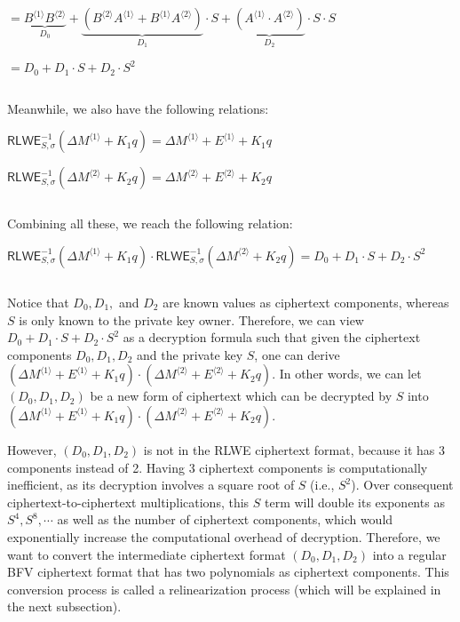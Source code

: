 $ = \underbrace{B^{\langle 1 \rangle}B^{\langle 2 \rangle}}_{D_0}  + \underbrace{(B^{\langle 2 \rangle}A^{\langle 1 \rangle} + B^{\langle 1 \rangle}A^{\langle 2 \rangle})}_{D_1} \cdot S + \underbrace{(A^{\langle 1 \rangle} \cdot A^{\langle 2 \rangle})}_{D_2} \cdot S \cdot S $



$= D_0 + D_1\cdot S + D_2\cdot S^2$



$ $

Meanwhile, we also have the following relations:

$\textsf{RLWE}_{S, \sigma}^{-1}(\Delta M^{\langle 1 \rangle} + K_1q) = \Delta M^{\langle 1 \rangle} + E^{\langle 1 \rangle} + K_1q$

$\textsf{RLWE}_{S, \sigma}^{-1}(\Delta M^{\langle 2 \rangle} + K_2q) = \Delta M^{\langle 2 \rangle} + E^{\langle 2 \rangle} + K_2q$

$ $

Combining all these, we reach the following relation: 

$\textsf{RLWE}_{S, \sigma}^{-1}(\Delta M^{\langle 1 \rangle} + K_1q) \cdot \textsf{RLWE}_{S, \sigma}^{-1}(\Delta M^{\langle 2 \rangle} + K_2q) = D_0 + D_1\cdot S + D_2\cdot S^2$

$ $

Notice that $D_0, D_1,$ and $D_2$ are known values as ciphertext components, whereas $S$ is only known to the private key owner. Therefore, we can view $D_0 + D_1\cdot S + D_2\cdot S^2$ as a decryption formula such that given the ciphertext components $D_0, D_1, D_2$ and the private key $S$, one can derive $(\Delta M^{\langle 1 \rangle} + E^{\langle 1 \rangle} + K_1q) \cdot (\Delta M^{\langle 2 \rangle} + E^{\langle 2 \rangle} + K_2q)$. In other words, we can let $(D_0, D_1, D_2)$ be a new form of ciphertext which can be decrypted by $S$ into $(\Delta M^{\langle 1 \rangle} + E^{\langle 1 \rangle} + K_1q) \cdot (\Delta M^{\langle 2 \rangle} + E^{\langle 2 \rangle} + K_2q)$. 

However, $(D_0, D_1, D_2)$ is not in the RLWE ciphertext format, because it has 3 components instead of 2. Having 3 ciphertext components is computationally inefficient, as its decryption involves a square root of $S$ (i.e., $ S^2$). Over consequent ciphertext-to-ciphertext multiplications, this $S$ term will double its exponents as $S^4, S^8, \cdots$ as well as the number of ciphertext components, which would exponentially increase the computational overhead of decryption. Therefore, we want to convert the intermediate ciphertext format $(D_0, D_1, D_2)$ into a regular BFV ciphertext format that has two polynomials as ciphertext components. This conversion process is called a relinearization process (which will be explained in the next subsection). 



